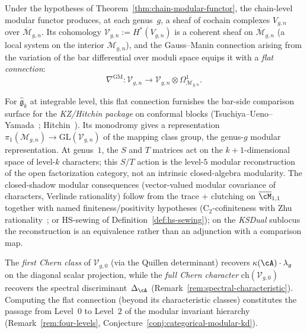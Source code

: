 \begin{remark}%
\label{rem:moduli-variation}%
%
%
Under the hypotheses of Theorem~\ref{thm:chain-modular-functor}, the
chain-level modular functor produces, at each genus~$g$, a sheaf of
cochain complexes
$V_{g,n}$ over $\overline{\mathcal{M}}_{g,n}$.
Its cohomology $\mathcal{V}_{g,n} := H^*(V_{g,n})$
is a coherent sheaf on $\overline{\mathcal{M}}_{g,n}$
(a local system on the interior $\mathcal{M}_{g,n}$), and
the Gauss--Manin connection arising from the variation of
the bar differential over moduli space equips it with
a \emph{flat connection}:
\[
\nabla^{\mathrm{GM}}\colon
\mathcal{V}_{g,n} \to
\mathcal{V}_{g,n} \otimes \Omega^1_{\mathcal{M}_{g,n}}.
\]

For $\widehat{\mathfrak{g}}_k$ at integrable level, this flat
connection furnishes the bar-side comparison surface for the
\emph{KZ/Hitchin package}
on conformal blocks
(Tsuchiya--Ueno--Yamada~\cite{TUY89};
Hitchin~\cite{Hitchin90}).
Its monodromy gives a representation
$\pi_1(\mathcal{M}_{g,n}) \to \mathrm{GL}(\mathcal{V}_{g,n})$
of the mapping class group, the genus-$g$
modular representation. At genus~$1$, the $S$ and $T$ matrices act on
the $k{+}1$-dimensional space of level-$k$ characters; this $S/T$
action is the level-$5$ modular reconstruction of the open
factorization category, not an intrinsic closed-algebra modularity.
The closed-shadow modular consequences (vector-valued modular
covariance of characters, Verlinde rationality) follow from the
trace + clutching on $\overline{\cM}_{1,1}$ together with named
finiteness/positivity hypotheses (\textsc{C}$_2$-cofiniteness with
Zhu rationality~\cite{Zhu96}; or HS-sewing of
Definition~\ref{def:hs-sewing}); on the \emph{KSDual} sublocus the
reconstruction is an equivalence rather than an adjunction with a
comparison map.

The \emph{first Chern class} of $\mathcal{V}_{g,0}$
(via the Quillen determinant) recovers
$\kappa(\cA) \cdot \lambda_g$ on the diagonal scalar projection, while the
\emph{full Chern character}
$\mathrm{ch}(\mathcal{V}_{g,0})$ recovers the spectral
discriminant~$\Delta_{\cA}$
(Remark~\ref{rem:spectral-characteristic}).
Computing the flat connection (beyond its characteristic
classes) constitutes the passage from Level~$0$ to Level~$2$ of the
modular invariant hierarchy
(Remark~\ref{rem:four-levels},
Conjecture~\ref{conj:categorical-modular-kd}).
\end{remark}

